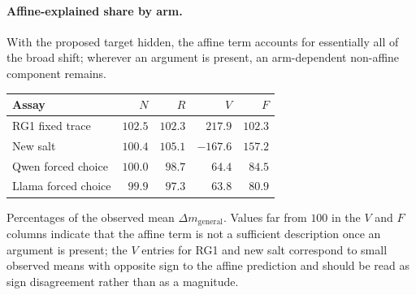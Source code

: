 \documentclass[letterpaper]{article}
\begin{document}
\paragraph{Affine-explained share by arm.}
With the proposed target hidden, the affine term accounts for essentially all of the broad shift; wherever an argument is present, an arm-dependent non-affine component remains.

\begin{center}
\small
\begin{tabular}{@{}lrrrr@{}}
\toprule
Assay & $N$ & $R$ & $V$ & $F$ \\
\midrule
RG1 fixed trace & $102.5$ & $102.3$ & $217.9$ & $102.3$ \\
New salt & $100.4$ & $105.1$ & $-167.6$ & $157.2$ \\
Qwen forced choice & $100.0$ & $98.7$ & $64.4$ & $84.5$ \\
Llama forced choice & $99.9$ & $97.3$ & $63.8$ & $80.9$ \\
\bottomrule
\end{tabular}
\end{center}

\noindent Percentages of the observed mean $\Delta m_{\mathrm{general}}$. Values far from $100$ in the $V$ and $F$ columns indicate that the affine term is not a sufficient description once an argument is present; the $V$ entries for RG1 and new salt correspond to small observed means with opposite sign to the affine prediction and should be read as sign disagreement rather than as a magnitude.
\end{document}
